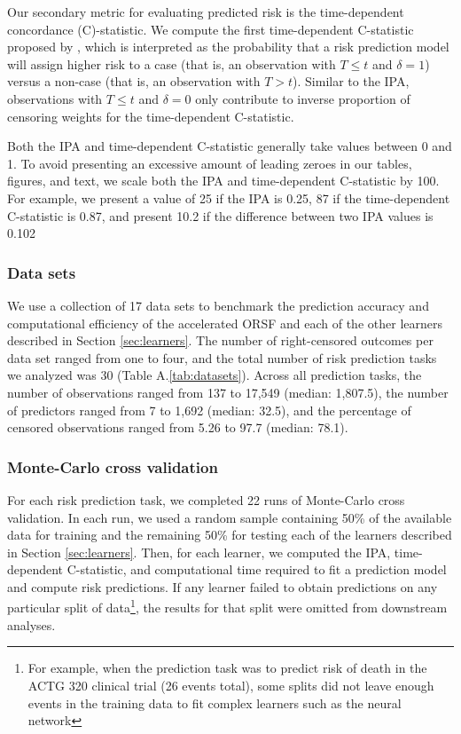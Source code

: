\documentclass[twoside,11pt]{article}\usepackage[]{graphicx}\usepackage[]{xcolor}
\newcommand{\ie}{that is}
\newcommand{\secref}[1]{Section \ref{#1}}
\newcommand{\tabrefAppendix}[1]{Table A.\ref{#1}}
\begin{document}
Our secondary metric for evaluating predicted risk is the time-dependent concordance (C)-statistic. We compute the first time-dependent C-statistic proposed by \citet[][Equation~3]{blanche2013estimating}, which is interpreted as the probability that a risk prediction model will assign higher risk to a case (\ie, an observation with $T \leq t$ and $\delta = 1$) versus a non-case (\ie, an observation with $T > t$). Similar to the IPA, observations with $T \leq t$ and $\delta = 0$ only contribute to inverse proportion of censoring weights for the time-dependent C-statistic.

Both the IPA and time-dependent C-statistic generally take values between 0 and 1. To avoid presenting an excessive amount of leading zeroes in our tables, figures, and text, we scale both the IPA and time-dependent C-statistic by 100. For example, we present a value of 25 if the IPA is 0.25, 87 if the time-dependent C-statistic is 0.87, and present 10.2 if the difference between two IPA values is 0.102

\subsubsection{Data sets}

We use a collection of 17 data sets to benchmark the prediction accuracy and computational efficiency of the accelerated ORSF and each of the other learners described in \secref{sec:learners}. The number of right-censored outcomes per data set ranged from one to four, and the total number of risk prediction tasks we analyzed was 30 (\tabrefAppendix{tab:datasets}). Across all prediction tasks, the number of observations ranged from 137 to 17,549 (median: 1,807.5), the number of predictors ranged from 7 to 1,692 (median: 32.5), and the percentage of censored observations ranged from 5.26 to 97.7 (median: 78.1).

\subsubsection{Monte-Carlo cross validation}

For each risk prediction task, we completed 22 runs of Monte-Carlo cross validation. In each run, we used a random sample containing 50\% of the available data for training and the remaining 50\% for testing each of the learners described in \secref{sec:learners}. Then, for each learner, we computed the IPA, time-dependent C-statistic, and computational time required to fit a prediction model and compute risk predictions. If any learner failed to obtain predictions on any particular split of data\footnote{For example, when the prediction task was to predict risk of death in the ACTG 320 clinical trial (26 events total), some splits did not leave enough events in the training data to fit complex learners such as the neural network}, the results for that split were omitted from downstream analyses.
\end{document}
